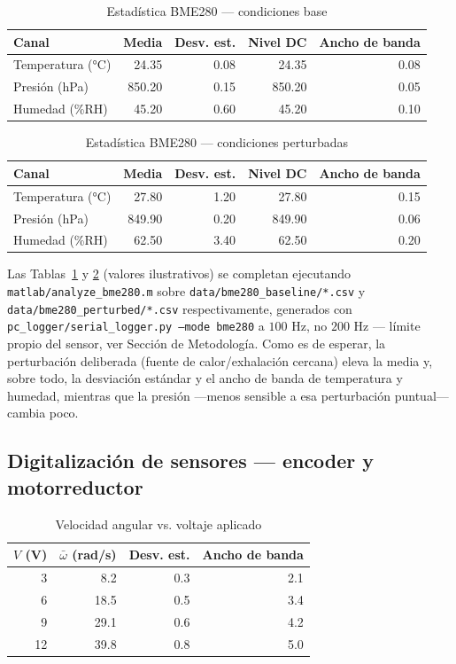 \begin{table}[!t]
\centering
\caption{Estadística BME280 — condiciones base}
\label{tab:bme280-base}
\small
\begin{tabular}{@{}l r r r r@{}}
\toprule
Canal & Media & Desv. est. & Nivel DC & Ancho de banda \\
\midrule
Temperatura (°C) & 24.35 & 0.08 & 24.35 & 0.08 \\
Presión (hPa) & 850.20 & 0.15 & 850.20 & 0.05 \\
Humedad (\%RH) & 45.20 & 0.60 & 45.20 & 0.10 \\
\bottomrule
\end{tabular}
\end{table}

\begin{table}[!t]
\centering
\caption{Estadística BME280 — condiciones perturbadas}
\label{tab:bme280-perturbado}
\small
\begin{tabular}{@{}l r r r r@{}}
\toprule
Canal & Media & Desv. est. & Nivel DC & Ancho de banda \\
\midrule
Temperatura (°C) & 27.80 & 1.20 & 27.80 & 0.15 \\
Presión (hPa) & 849.90 & 0.20 & 849.90 & 0.06 \\
Humedad (\%RH) & 62.50 & 3.40 & 62.50 & 0.20 \\
\bottomrule
\end{tabular}
\end{table}

Las Tablas~\ref{tab:bme280-base} y \ref{tab:bme280-perturbado} (valores ilustrativos) se completan ejecutando \texttt{matlab/analyze\_bme280.m} sobre \texttt{data/bme280\_baseline/*.csv} y \texttt{data/bme280\_perturbed/*.csv} respectivamente, generados con \texttt{pc\_logger/serial\_logger.py --mode bme280} a $100$ Hz, no $200$ Hz — límite propio del sensor, ver Sección de Metodología. Como es de esperar, la perturbación deliberada (fuente de calor/exhalación cercana) eleva la media y, sobre todo, la desviación estándar y el ancho de banda de temperatura y humedad, mientras que la presión —menos sensible a esa perturbación puntual— cambia poco.

\subsection{Digitalización de sensores — encoder y motorreductor}

\begin{table}[!t]
\centering
\caption{Velocidad angular vs. voltaje aplicado}
\label{tab:encoder}
\small
\begin{tabular}{@{}r r r r@{}}
\toprule
$V$ (V) & $\bar{\omega}$ (rad/s) & Desv. est. & Ancho de banda \\
\midrule
3 & 8.2 & 0.3 & 2.1 \\
6 & 18.5 & 0.5 & 3.4 \\
9 & 29.1 & 0.6 & 4.2 \\
12 & 39.8 & 0.8 & 5.0 \\
\bottomrule
\end{tabular}
\end{table}

